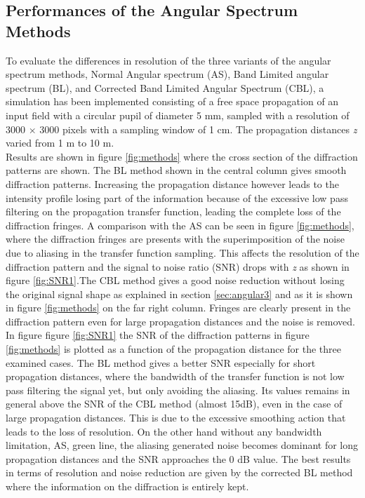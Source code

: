  \subsection{Performances of the Angular Spectrum Methods}
 \label{sec:perfAS}
 To evaluate the differences in resolution of the three variants of the angular spectrum methods, Normal Angular spectrum (AS), Band Limited angular spectrum (BL), and Corrected Band Limited Angular Spectrum (CBL), a simulation has been implemented consisting of a free space propagation of an input field with a circular pupil of diameter 5 mm, sampled with a resolution of 3000 $\times$ 3000 pixels with a sampling window of 1 cm. The propagation distances \textit{z} varied from 1 m to 10 m.\\ 
 Results are shown in figure \ref{fig:methods} where the cross section of the diffraction patterns are shown. 
 The BL method shown in the central column gives smooth diffraction patterns. Increasing the propagation distance however leads to the intensity profile losing part of the information because of the excessive low pass filtering on the propagation transfer function, leading the complete loss of the diffraction fringes. A comparison with the AS can be seen in figure \ref{fig:methods}, where the diffraction fringes are presents with the superimposition of the noise due to aliasing in the transfer function sampling. This affects the resolution of the diffraction pattern and the signal to noise ratio (SNR) drops with \textit{z} as shown in figure \ref{fig:SNR1}.The CBL method gives a good noise reduction without losing the original signal shape as explained in section \ref{sec:angular3} and as it is shown in figure \ref{fig:methods} on the far right column. Fringes are clearly present in the diffraction pattern even for large propagation distances and the noise is removed. \\
 In figure figure \ref{fig:SNR1} the SNR of the diffraction patterns in figure \ref{fig:methods} is plotted as a function of the propagation distance for the three examined cases. The BL method gives a better SNR especially for short propagation distances, where the bandwidth of the transfer function is not low pass filtering the signal yet, but only avoiding the aliasing. Its values remains in general above the SNR of the CBL method (almost 15dB), even in the case of large propagation distances. This is due to the excessive smoothing action that leads to the loss of resolution. On the other hand without any bandwidth limitation, AS, green line, the aliasing generated noise becomes dominant for long propagation distances and the SNR approaches the 0 dB value. The best results in terms of resolution and noise reduction are given by the corrected BL method where the information on the diffraction is entirely kept. 
